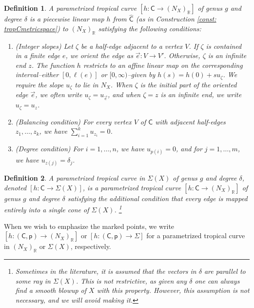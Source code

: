 \documentclass{article}
\newtheorem{definition}{Definition}[section]
\newcommand{\tropC}{\mathsf{C}}
\begin{document}
	\begin{definition}\label{def: curves in NX}
	      A parametrized tropical curve $[h: \tropC \rightarrow (N_X)_{\mathbb{R}}]$ of genus $g$ and degree $\delta$ is a piecewise linear map $h$ from $\hat{\tropC}$ (as in Construction \ref{const: tropCmetricspace}) to $(N_X)_{\mathbb{R}}$ satisfying the following conditions:
\begin{enumerate}
    \item (Integer slopes) Let $\zeta$ be a half-edge adjacent to a vertex $V$. If $\zeta$ is contained in a finite edge $e$, we orient the edge as $\vec{e} \colon V \to V'$. Otherwise, $\zeta$ is an infinite end $z$. The function $h$ restricts to an affine linear map on the corresponding interval--either $[0, \ell(e)]$ or $[0, \infty)$--given by $h(s) = h(0) + s u_{\zeta}$. We require the slope $u_\zeta$ to lie in $N_X$. When $\zeta$ is the initial part of the oriented edge $\vec{e}$, we often write $u_\zeta = u_{\vec{e}}$, and when $\zeta = z$ is an infinite end, we write $u_\zeta = u_z$.
    
    \item (Balancing condition) For every vertex $V$ of $\tropC$ with adjacent half-edges $z_1, \ldots, z_k$, we have $\sum_{i=1}^k u_{z_i} = 0$.
    
    \item (Degree condition) For $i = 1, \ldots, n$, we have $u_{p(i)} = 0$, and for $j = 1, \ldots, m$, we have $u_{z(j)} = \delta_j$.
\end{enumerate}

	\end{definition}



    \begin{definition} \label{def: curves in Sigma}
     A parametrized tropical curve in $\Sigma(X)$ of genus $g$ and degree $\delta$, denoted $[h: \tropC \rightarrow \Sigma(X)]$, is a parametrized tropical curve $[h: \tropC \rightarrow (N_X)_{\mathbb{R}}]$ of genus $g$ and degree $\delta$ satisfying the additional condition that every edge is mapped entirely into a single cone of $\Sigma(X)$. \footnote{Sometimes in the literature, it is assumed that the vectors in $\delta$ are parallel to some ray in $\Sigma(X)$. This is not restrictive, as given any $\delta$ one can always find a smooth blowup of $X$ with this property. However, this assumption is not necessary, and we will avoid making it.}
\end{definition}


    When we wish to emphasize the marked points, we write $[h: (\tropC, \mathsf{p}) \rightarrow (N_X)_{\mathbb{R}}]$ or $[h: (\tropC, \mathsf{p}) \rightarrow \Sigma]$ for a parametrized tropical curve in $(N_X)_{\mathbb{R}}$ or $\Sigma(X)$, respectively. 
\end{document}
